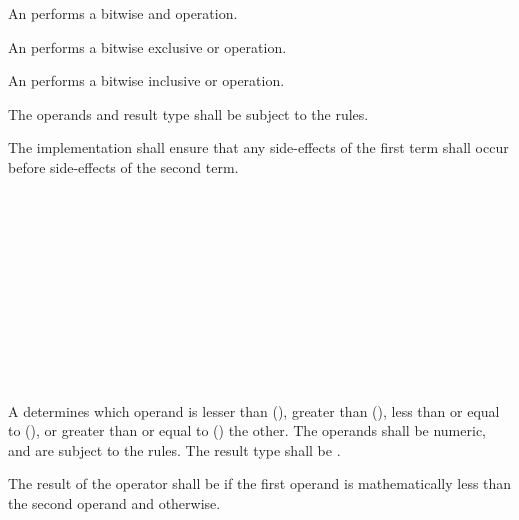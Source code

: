 \specsubsubitem
An  performs a bitwise and operation.

\specsubsubitem
An  performs a bitwise exclusive or
operation.

\specsubsubitem
An  performs a bitwise inclusive or
operation.

\specsubsubitem
The operands and result type shall be subject to the 
rules.

\specsubsubitem
The implementation shall ensure that any side-effects of the first term shall
occur before side-effects of the second term.


\begin{grammar}
 \\
	 \\
	 \terminal{<}  \\
	 \terminal{>}  \\
	 \terminal{<=}  \\
	 \terminal{>=}  \\

 \\
	 \\
	 \terminal{==}  \\
	 \terminal{!=}  \\
\end{grammar}

\specsubsubitem
A  determines which operand is lesser than
(\terminal{<}), greater than (\terminal{>}), less than or equal to
(\terminal{<=}), or greater than or equal to (\terminal{>=}) the other. The
operands shall be numeric, and are subject to the 
rules.  The result type shall be .

\specsubsubitem
The result of the \terminal{<} operator shall be  if the first
operand is mathematically less than the second operand and 
otherwise.

